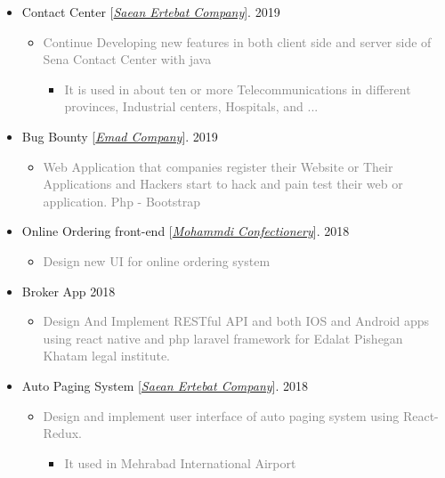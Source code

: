 \documentclass[10pt,a4paper,sans]{moderncv} %
\begin{document}
\begin{itemize}
		\item Contact Center [\href{http://www.senatelecom.com/}{\emph{Saean Ertebat Company}}]. \hfill 2019
		\begin{itemize}
			\item \textcolor{gray} {Continue Developing new features in both client side and server side of Sena Contact Center  with java}
			\begin{itemize}
				\item \textcolor{gray} {It is used in about ten or more Telecommunications in different provinces, Industrial centers, Hospitals, and ...}
			\end{itemize}
		\end{itemize}


		\item Bug Bounty [\href{http://emad24.ir/}{\emph{Emad Company}}]. \hfill 2019
		\begin{itemize}
			\item \textcolor{gray} {Web Application that companies register their Website or Their Applications and Hackers start to hack and pain test their web or application. Php - Bootstrap}
		\end{itemize}

		\item Online Ordering front-end [\href{http://#/}{\emph{Mohammdi Confectionery}}]. \hfill 2018
		\begin{itemize}
			\item \textcolor{gray} { Design new UI for online ordering system }
		\end{itemize}

		\item Broker App \hfill 2018
		\begin{itemize}
			\item \textcolor{gray} { Design And Implement RESTful API and both IOS and Android apps using react native and php laravel framework for Edalat Pishegan Khatam legal institute. }
		\end{itemize}

		\item Auto Paging System [\href{http://www.senatelecom.com/}{\emph{Saean Ertebat Company}}]. \hfill 2018
		\begin{itemize}
			\item \textcolor{gray} {Design and implement user interface of auto paging system using React-Redux.}
			\begin{itemize}
				\item \textcolor{gray} {It used in Mehrabad International Airport}
			\end{itemize}
		\end{itemize}


\end{itemize}
\end{document}
